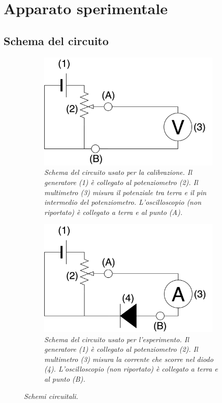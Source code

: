 \documentclass[11pt, a4paper, twocolumn]{article}
\begin{document}
\section{Apparato sperimentale}\label{sec:apparato-sperimentale}
  \subsection{Schema del circuito}\label{subsec:schema-circuito}
    \begin{figure}%
      \centering
      \begin{subfigure}[t]{.47\textwidth}
        \includegraphics[width=8.75cm]{./assets/1/circuito-calibrazione.png}
        \caption{
          \emph{
            Schema del circuito usato per la calibrazione. Il generatore (1) è collegato al potenziometro (2).
            Il multimetro (3) misura il potenziale tra terra e il pin intermedio del potenziometro.
            L'oscilloscopio (non riportato) è collegato a terra e al punto (A).
          }
        }
        \label{fig:circuito-calibrazione}
      \end{subfigure}
      \hspace{5mm}
      \begin{subfigure}[t]{.47\textwidth}
        \includegraphics[width=8.75cm]{./assets/1/circuito.png}
        \caption{
          \emph{
            Schema del circuito usato per l'esperimento. Il generatore (1) è collegato al potenziometro (2).
            Il multimetro (3) misura la corrente che scorre nel diodo (4). L'oscilloscopio (non riportato) è
            collegato a terra e al punto (B).
          }
        }
        \label{fig:circuito-prova}
      \end{subfigure}
      \caption{\emph{Schemi circuitali.}}
      \label{fig:circuiti}
    \end{figure}
\end{document}
